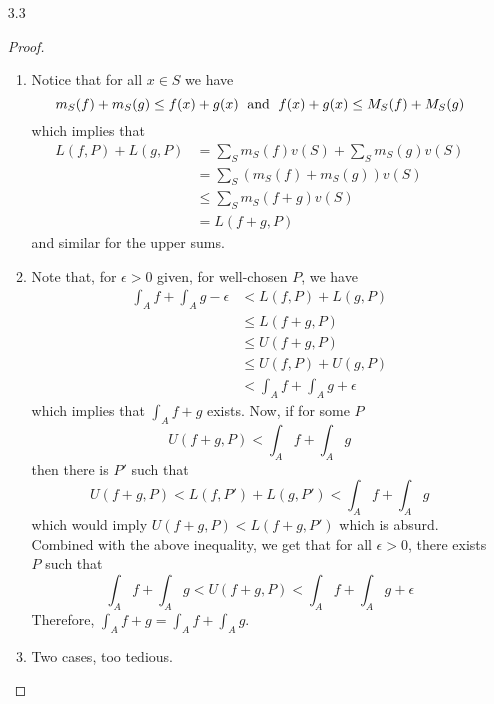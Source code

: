 \begin{enumerate}
    \item[3.3] 
    \begin{proof}
    \begin{enumerate}
        \item Notice that for all \( x \in S \) we have
        \[
        m_S(f) + m_S(g) \leq f(x) + g(x) \hspace{1 mm} \text{ and } \hspace{1mm} f(x) + g(x) \leq M_S(f) + M_S(g)
        \]
        which implies that 
        \begin{align*}
        L(f,P) + L(g,P) &= \sum_S m_S(f)v(S) + \sum_S m_S(g)v(S) \\
        &= \sum_S (m_S(f)+m_S(g))v(S) \\
        & \leq \sum_S m_S(f+g)v(S) \\
        &= L(f+g,P)
        \end{align*}
        and similar for the upper sums.
        
        \item Note that, for \( \epsilon > 0 \) given, for well-chosen \( P \), we have
        \begin{align*}
        \int_A f + \int_A g - \epsilon &< L(f,P) + L(g,P) \\
        &\leq L(f+g, P) \\
        &\leq U(f+g,P) \\
        &\leq U(f,P) + U(g,P) \\
        &< \int_A f + \int_A g + \epsilon
        \end{align*}
        which implies that \( \int_A f+g \) exists. Now, if for some \( P \)
        \[
        U(f+g,P) < \int_A f + \int_A g
        \]
        then there is \( P' \) such that
        \[
        U(f+g,P) < L(f,P') + L(g,P') < \int_A f + \int_A g
        \]
        which would imply \( U(f+g,P) < L(f+g,P') \) which is absurd. Combined with the above inequality, we get that for all \( \epsilon > 0 \), there exists \( P \) such that
        \[
        \int_A f + \int_A g < U(f+g,P) < \int_A f + \int_A g + \epsilon   
        \]
        Therefore, \( \int_A f+g = \int_A f + \int_A g \). 
        
        \item Two cases, too tedious.
    \end{enumerate}
    \end{proof}
    

\end{enumerate}
